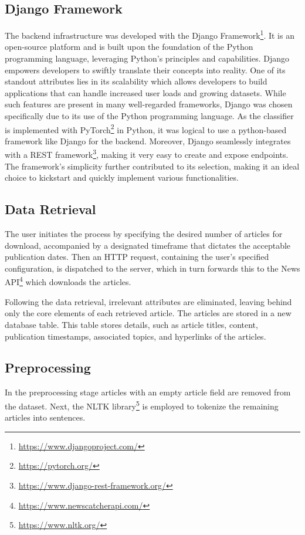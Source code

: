 \documentclass[a4paper,10pt]{report}
\begin{document}
\subsection{Django Framework}
The backend infrastructure was developed with the Django Framework\footnote{\url{https://www.djangoproject.com/}}. It is an open-source platform and is built upon the foundation of the Python programming language, leveraging Python's principles and capabilities. Django empowers developers to swiftly translate their concepts into reality. One of its standout attributes lies in its scalability which allows developers to build applications that can handle increased user loads and growing datasets. While such features are present in many well-regarded frameworks, Django was chosen specifically due to its use of the Python programming language. As the classifier is implemented with PyTorch\footnote{\url{https://pytorch.org/}} in Python, it was logical to use a python-based framework like Django for the backend. Moreover, Django seamlessly integrates with a REST framework\footnote{\url{https://www.django-rest-framework.org/}}, making it very easy to create and expose endpoints. The framework's simplicity further contributed to its selection, making it an ideal choice to kickstart and quickly implement various functionalities.

\subsection{Data Retrieval}
The user initiates the process by specifying the desired number of articles for download, accompanied by a designated timeframe that dictates the acceptable publication dates. Then an HTTP request, containing the user's specified configuration, is dispatched to the server, which in turn forwards this to the News API\footnote{\url{https://www.newscatcherapi.com/}} which downloads the articles.

Following the data retrieval, irrelevant attributes are eliminated, leaving behind only the core elements of each retrieved article. The articles are stored in a new database table. This table stores details, such as article titles, content, publication timestamps, associated topics, and hyperlinks of the articles.

\subsection{Preprocessing}
In the preprocessing stage articles with an empty article field are removed from the dataset. Next, the NLTK library\footnote{\url{https://www.nltk.org/}} is employed to tokenize the remaining articles into sentences.
\end{document}
